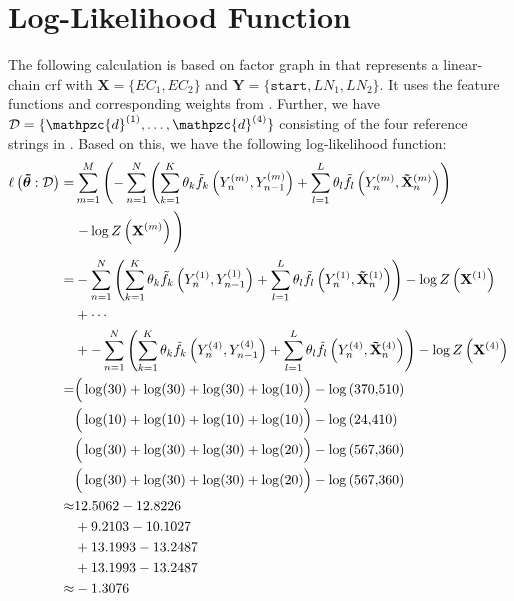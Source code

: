 \section{Log-Likelihood Function}\label{app:sec-log-likelihood-function}
The following calculation is based on \gls{factor graph} in  that represents a \gls{linear-chain crf} with $\mathbf{X}=\{EC_1,EC_2\}$ and $\mathbf{Y}=\{\texttt{start},LN_1,LN_2\}$.
It uses the \glspl{feature function} and corresponding weights from .
Further, we have $\mathcal{D}=\{\mathpzc{d}^{(1)},\dots,\mathpzc{d}^{(4)}\}$ consisting of the four reference strings in .
Based on this, we have the following log-likelihood function:
\begin{equation*}
  \begin{split}
    \ell\left(\bm{\tilde{\theta}}:\mathcal{D}\right) = & \sum_{m=1}^M \left(-\sum_{n=1}^N \left(\sum_{k=1}^K\theta_k \tilde{f}_k\left(Y_n^{(m)},Y_{n-1}^{(m)}\right)+\sum_{l=1}^L\theta_l \tilde{f}_l\left(Y_n^{(m)},\mathbf{\tilde{X}}_n^{(m)}\right)\right)\right. \\
    &\left.-\log Z\left(\mathbf{X}^{(m)}\right)\vphantom{\sum_{l=1}^L}\right)\\
    =&-\sum_{n=1}^N \left(\sum_{k=1}^K\theta_k \tilde{f}_k\left(Y_n^{(1)},Y_{n-1}^{(1)}\right)+\sum_{l=1}^L\theta_l \tilde{f}_l\left(Y_n^{(1)},\mathbf{\tilde{X}}_n^{(1)}\right)\right)-\log Z\left(\mathbf{X}^{(1)}\right)\vphantom{\sum_{l=1}^L}\\
    &+\cdots\\
    &+-\sum_{n=1}^N \left(\sum_{k=1}^K\theta_k \tilde{f}_k\left(Y_n^{(4)},Y_{n-1}^{(4)}\right)+\sum_{l=1}^L\theta_l \tilde{f}_l\left(Y_n^{(4)},\mathbf{\tilde{X}}_n^{(4)}\right)\right)-\log Z\left(\mathbf{X}^{(4)}\right)\vphantom{\sum_{l=1}^L}\\
    =&\Big(\log(30)+\log(30)+\log(30)+\log(10)\Big)-\log\left(\num{370510}\right)\\
    &\Big(\log(10)+\log(10)+\log(10)+\log(10)\Big)-\log\left(\num{24410}\right)\\
    &\Big(\log(30)+\log(30)+\log(30)+\log(20)\Big)-\log\left(\num{567360}\right)\\
    &\Big(\log(30)+\log(30)+\log(30)+\log(20)\Big)-\log\left(\num{567360}\right)\\
    \approx&12.5062-12.8226\\
    &+9.2103-10.1027\\
    &+13.1993-13.2487\\
    &+13.1993-13.2487\\
    \approx&-1.3076
 \end{split}
\end{equation*}
